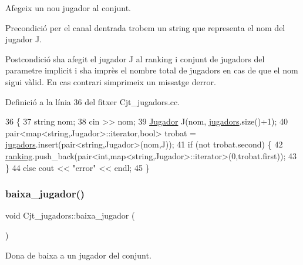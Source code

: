 Afegeix un nou jugador al conjunt. 

\begin{DoxyPrecond}{Precondició}
per el canal d\textquotesingle{}entrada trobem un string que representa el nom del jugador J. 
\end{DoxyPrecond}
\begin{DoxyPostcond}{Postcondició}
s\textquotesingle{}ha afegit el jugador J al ranking i conjunt de jugadors del parametre implicit i s\textquotesingle{}ha imprès el nombre total de jugadors en cas de que el nom sigui vàlid. En cas contrari s\textquotesingle{}imprimeix un missatge d\textquotesingle{}error. 
\end{DoxyPostcond}


Definició a la línia 36 del fitxer Cjt\+\_\+jugadors.\+cc.


\begin{DoxyCode}
36                                \{
37     \textcolor{keywordtype}{string} nom;
38     cin >> nom;
39     \mbox{\hyperlink{class_jugador}{Jugador}} J(nom, \mbox{\hyperlink{class_cjt__jugadors_a9a7fd899cca7f3c126120c8e7b4719d4}{jugadors}}.size()+1);
40     pair<map<string,Jugador>::iterator,\textcolor{keywordtype}{bool}> trobat = \mbox{\hyperlink{class_cjt__jugadors_a9a7fd899cca7f3c126120c8e7b4719d4}{jugadors}}.insert(pair<string,Jugador>(nom,J));
41     \textcolor{keywordflow}{if} (not trobat.second) \{
42         \mbox{\hyperlink{class_cjt__jugadors_af9f7e71820fb657bf489ce72a31e8034}{ranking}}.push\_back(pair<\textcolor{keywordtype}{int},map<string,Jugador>::iterator>(0,trobat.first));
43     \}
44     \textcolor{keywordflow}{else} cout << \textcolor{stringliteral}{"error"} << endl;
45 \}
\end{DoxyCode}
\mbox{\label{class_cjt__jugadors_a902057929aebe8b46ff16395ad22def2}} 
\subsubsection{\texorpdfstring{baixa\+\_\+jugador()}{baixa\_jugador()}}
{\footnotesize\ttfamily void Cjt\+\_\+jugadors\+::baixa\+\_\+jugador (\begin{DoxyParamCaption}{ }\end{DoxyParamCaption})}



Dona de baixa a un jugador del conjunt. 


